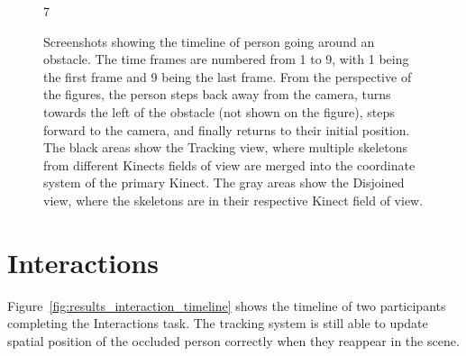 \begin{figure}[!h]
{  }{7}

  \caption{Screenshots showing the timeline of person going around an obstacle. The time frames are numbered from 1 to 9, with 1 being the first frame and 9 being the last frame. From the perspective of the figures, the person steps back away from the camera, turns towards the left of the obstacle (not shown on the figure), steps forward to the camera, and finally returns to their initial position. The black areas show the Tracking view, where multiple skeletons from different Kinects fields of view are merged into the coordinate system of the primary Kinect. The gray areas show the Disjoined view, where the skeletons are in their respective Kinect field of view.}
  
  \label{fig:results_obstacle_timeline}
\end{figure}

\section{Interactions}
\label{sec:results_interactions}

Figure~\ref{fig:results_interaction_timeline} shows the timeline of two participants completing the Interactions task. The tracking system is still able to update spatial position of the occluded person correctly when they reappear in the scene. 

